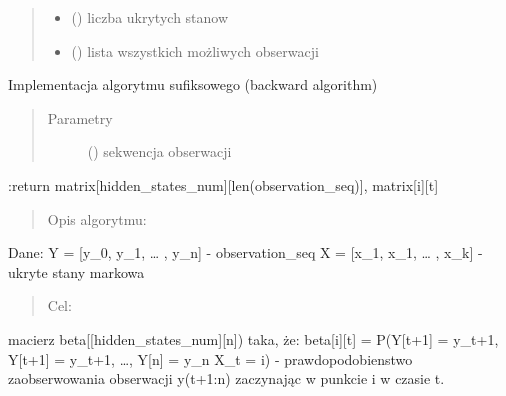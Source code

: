 \documentclass[letterpaper,10pt,polish]{sphinxmanual}
\begin{document}
\begin{fulllineitems}
\begin{fulllineitems}
\begin{quote}
\begin{description}
\begin{itemize}
\begin{itemize}
\end{itemize}


\item {} 
 () \textendash{} liczba ukrytych stanow

\item {} 
 () \textendash{} lista wszystkich możliwych obserwacji

\end{itemize}

\end{description}\end{quote}

\end{fulllineitems}


\begin{fulllineitems}
\label{\detokenize{HMM:HMM.HMM.backward_algorithm}}
Implementacja algorytmu sufiksowego (backward algorithm)
\begin{quote}\begin{description}
\item[{Parametry}] \leavevmode
{} () \textendash{} sekwencja obserwacji

\end{description}\end{quote}

:return matrix{[}hidden\_states\_num{]}{[}len(observation\_seq){]}, matrix{[}i{]}{[}t{]}
\begin{quote}

Opis algorytmu:
\end{quote}

Dane:
Y = {[}y\_0, y\_1, … , y\_n{]} - observation\_seq
X = {[}x\_1, x\_1, … , x\_k{]} - ukryte stany markowa
\begin{quote}

Cel:
\end{quote}

macierz beta{[}{[}hidden\_states\_num{]}{[}n{]}) taka, że:
beta{[}i{]}{[}t{]} = P(Y{[}t+1{]} = y\_t+1, Y{[}t+1{]} = y\_t+1, …, Y{[}n{]} = y\_n \textbar{} X\_t = i) - prawdopodobienstwo
zaobserwowania obserwacji y(t+1:n) zaczynając w punkcie i w czasie t.
\begin{quote}


\end{quote}
\end{fulllineitems}
\end{fulllineitems}
\end{document}
